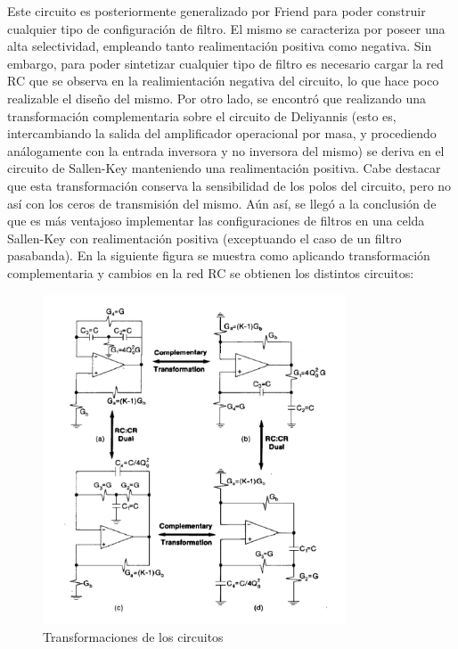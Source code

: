 Este circuito es posteriormente generalizado por Friend para poder construir cualquier tipo de configuración de filtro. El mismo se caracteriza por poseer una alta selectividad, empleando tanto realimentación positiva como negativa. Sin embargo, para poder sintetizar cualquier tipo de filtro es necesario cargar la red RC que se observa en la realimientación negativa del circuito, lo que hace poco realizable el diseño del mismo. Por otro lado, se encontró que realizando una transformación complementaria sobre el circuito de Deliyannis (esto es, intercambiando la salida del amplificador operacional por masa, y procediendo análogamente con la entrada inversora y no inversora del mismo) se deriva en el circuito de Sallen-Key manteniendo una realimentación positiva. Cabe destacar que esta transformación conserva la sensibilidad de los polos del circuito, pero no así con los ceros de transmisión del mismo. Aún así, se llegó a la conclusión de que es más ventajoso implementar las configuraciones de filtros en una celda Sallen-Key con realimentación positiva (exceptuando el caso de un filtro pasabanda).
En la siguiente figura se muestra como aplicando transformación complementaria y cambios en la red RC se obtienen los distintos circuitos:

\begin{figure}[h]
	\includegraphics[width=0.8\textwidth]{../Ejercicio2-DisenoDeCeldas/3CeldaSedra/Imagenes/Transformaciones SGB.png}
	\centering
	\caption{Transformaciones de los circuitos }
	\label{transSGM}
\end{figure}

